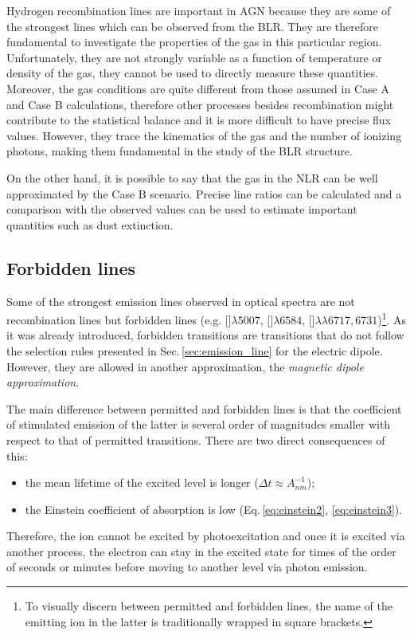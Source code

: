 \documentclass[../main.tex]{subfiles}
\begin{document}
Hydrogen recombination lines are important in AGN because they are some of the strongest lines which can be observed from the BLR.
They are therefore fundamental to investigate the properties of the gas in this particular region.
Unfortunately, they are not strongly variable as a function of temperature or density of the gas, they cannot be used to directly measure these quantities.
Moreover, the gas conditions are quite different from those assumed in Case A and Case B calculations, therefore other processes besides recombination might contribute to the statistical balance and it is more difficult to have precise flux values.
However, they trace the kinematics of the gas and the number of ionizing photons, making them fundamental in the study of the BLR structure.

On the other hand, it is possible to say that the gas in the NLR can be well approximated by the Case B scenario.
Precise line ratios can be calculated and a comparison with the observed values can be used to estimate important quantities such as dust extinction.
 
\subsection{Forbidden lines}
\label{sec:forb_line}

Some of the strongest emission lines observed in optical spectra are not recombination lines but forbidden lines (e.g. []$\lambda5007$, []$\lambda6584$, []$\lambda\lambda6717,6731$)\footnote{To visually discern between permitted and forbidden lines, the name of the emitting ion in the latter is traditionally wrapped in square brackets.}.
As it was already introduced, forbidden transitions are transitions that do not follow the selection rules presented in Sec.\,\ref{sec:emission_line} for the electric dipole.
However, they are allowed in another approximation, the \emph{magnetic dipole approximation}.

The main difference between permitted and forbidden lines is that the coefficient of stimulated emission of the latter is several order of magnitudes smaller with respect to that of permitted transitions.
There are two direct consequences of this:
\begin{itemize}
    \item the mean lifetime of the excited level is longer ($\Delta t \approx A_{nm}^{-1}$);
    \item the Einstein coefficient of absorption is low (Eq.\,\ref{eq:einstein2}, \ref{eq:einstein3}).
\end{itemize}
Therefore, the ion cannot be excited by photoexcitation and once it is excited via another process, the electron can stay in the excited state for times of the order of seconds or minutes before moving to another level via photon emission.
\end{document}
